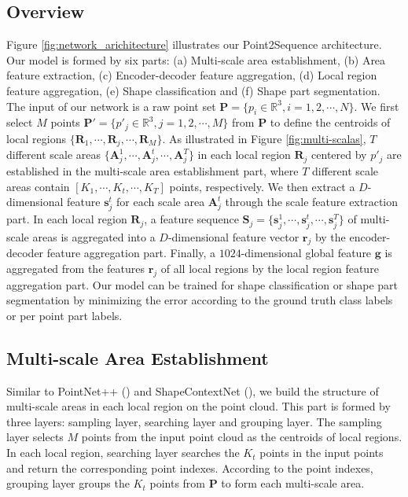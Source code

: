 \documentclass[letterpaper]{article}
\begin{document}
\subsection{Overview}
Figure \ref{fig:network_arichitecture} illustrates our Point2Sequence architecture. Our model is  formed by six parts: (a) Multi-scale area establishment, (b) Area feature extraction, (c) Encoder-decoder feature aggregation, (d) Local region feature aggregation, (e) Shape classification and (f) Shape part segmentation.
The input of our network is a raw point set $\mathbf{P}=\lbrace p_i \in \mathbb{R}^3, i=1,2,\cdots,N\rbrace$.
We first select $M$ points 
$\mathbf{P}'=\lbrace p'_j \in \mathbb{R}^3, j=1,2,\cdots,M\rbrace$
from $\mathbf{P}$ to define the centroids of local regions $\lbrace \bm{R}_1,\cdots, \bm{R}_j, \cdots, \bm{R}_M \rbrace$.
As illustrated in Figure \ref{fig:multi-scalas}, $T$ different scale areas $\lbrace \bm{A}_j^1, \cdots, \bm{A}_j^t, \cdots, \bm{A}_j^T \rbrace$ in each local region $\bm{R}_j$ centered by $p'_j$ are established in the multi-scale area establishment part, where $T$ different scale areas contain $[K_1,\cdots, K_t, \cdots,K_T]$ points, respectively.
We then extract a $D$-dimensional feature $\bm{s}_j^t$ for each scale area $\bm{A}_j^t$  through the scale feature extraction part.
In each local region $\bm{R}_j$, a feature sequence $\bm{S}_j=\lbrace \bm{s}_j^1,\cdots, \bm{s}_j^t, \cdots, \bm{s}_j^T\rbrace$ of multi-scale areas is aggregated into a $D$-dimensional feature vector $\bm{r}_j$ by the encoder-decoder feature aggregation part.
Finally, a $1024$-dimensional global feature $\bm{g}$ is aggregated from the features $\bm{r}_j$ of all local regions by the local region feature aggregation part.
Our model can be trained for shape classification or shape part segmentation by minimizing the error according to the ground truth class labels or per point part labels.  



\subsection{Multi-scale Area Establishment}
Similar to PointNet++ (\citealt{qi2017pointnet++}) and ShapeContextNet (\citealt{xie2018attentional}), we build the structure of multi-scale areas in each local region on the point cloud. This part is formed by three layers: sampling layer, searching layer and grouping layer.
The sampling layer selects $M$ points from the input point cloud as the centroids of local regions. 
In each local region, searching layer searches the $K_t$ points in the input points and return the corresponding point indexes. 
According to the point indexes, grouping layer groups the $K_t$ points from $\mathbf{P}$ to form each multi-scale area.
\end{document}
